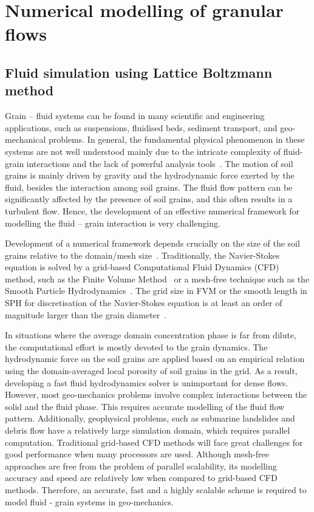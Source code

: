\chapter{Numerical modelling of granular flows}

\ifpdf
    \graphicspath{{Chapter3/figs/raster/}{Chapter3/figs/pdf/}{Chapter3/figs/}}
\else
    \graphicspath{{Chapter3/figs/vector/}{Chapter3/figs/}}
\fi


\section{Fluid simulation using Lattice Boltzmann method}

Grain -- fluid systems can be found in many scientific and engineering 
applications, such as suspensions, fluidised beds, sediment transport, and 
geo-mechanical problems. In general, the fundamental physical phenomenon in 
these systems are not well understood mainly due to the intricate complexity of 
fluid-grain interactions and the lack of powerful analysis 
tools~\citep{Han2007b}. The motion of soil grains is mainly driven by 
gravity and the hydrodynamic force exerted by the fluid, besides the 
interaction among soil grains. The fluid flow pattern 
can be significantly affected by the presence of soil grains, and this often 
results in a turbulent flow. Hence, the development of an effective numerical 
framework for modelling the fluid -- grain interaction is very challenging.

Development of a numerical framework depends crucially on the size of the soil 
grains relative to the domain/mesh size~\citep{Feng2007}. Traditionally, the 
Navier-Stokes equation is solved by a grid-based Computational Fluid Dynamics 
(CFD) method, such as the Finite Volume Method~\citep{Capecelatro2013} or a 
mesh-free technique such as the Smooth Particle Hydrodynamics~\citep{Sun2013}. 
The grid size in FVM or the smooth length in SPH for discretisation of the 
Navier-Stokes equation is at least an order of magnitude larger than the grain 
diameter~\citep{Xiong2014}. 

In situations where the average domain concentration phase is far from dilute, 
the computational effort is mostly devoted to the grain dynamics. The 
hydrodynamic force on the soil grains are applied based on an empirical 
relation using the domain-averaged local porosity of soil grains in the grid. 
As a result, developing a fast fluid hydrodynamics solver is unimportant for 
dense flows. However, most geo-mechanics problems involve complex interactions 
between the solid and the fluid phase. This requires accurate modelling of the 
fluid flow pattern. Additionally, geophysical problems, such as submarine 
landslides and debris flow have a relatively large simulation domain, which 
requires parallel computation. Traditional grid-based CFD methods will face 
great challenges for good performance when many processors are used. Although 
mesh-free approaches are free from the problem of parallel scalability, its 
modelling accuracy and speed are relatively low when compared to grid-based CFD 
methods. Therefore, an accurate, fast and a highly scalable scheme is required 
to model fluid - grain systems in geo-mechanics. 
 
